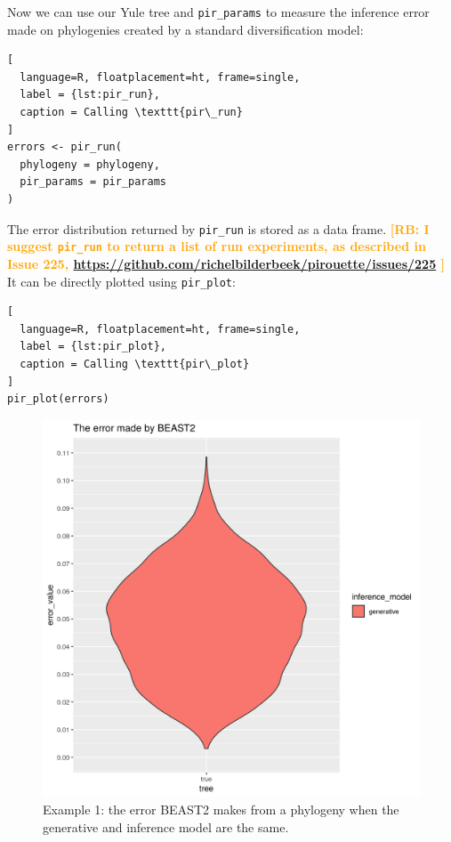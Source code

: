 \documentclass{article}
\newcommand{\richel}[1]{\textcolor{orange}{\textbf{[RB: #1]}}}
\begin{document}
Now we can use our Yule tree and \verb;pir_params; to measure 
the inference error made on phylogenies
created by a standard diversification model:

\begin{lstlisting}[
  language=R, floatplacement=ht, frame=single,
  label = {lst:pir_run},
  caption = Calling \texttt{pir\_run}
]
errors <- pir_run(
  phylogeny = phylogeny,
  pir_params = pir_params
)
\end{lstlisting}

The error distribution returned by \verb;pir_run; is stored as a data frame. 
\richel{
  I suggest \texttt{pir\_run} to return a list of run experiments,
  as described in Issue 225, 
  \url{https://github.com/richelbilderbeek/pirouette/issues/225}
}
It can be directly plotted using \verb;pir_plot;:

\begin{lstlisting}[
  language=R, floatplacement=ht, frame=single,
  label = {lst:pir_plot},
  caption = Calling \texttt{pir\_plot}
]
pir_plot(errors)
\end{lstlisting}

\begin{figure}[ht]
  \includegraphics[width=\textwidth]{example_1_errors.png}
  \caption{
    Example 1: the error BEAST2 makes from a phylogeny 
    when the generative and inference model are the same.
  }
  \label{fig:example_1}
\end{figure}
\end{document}
